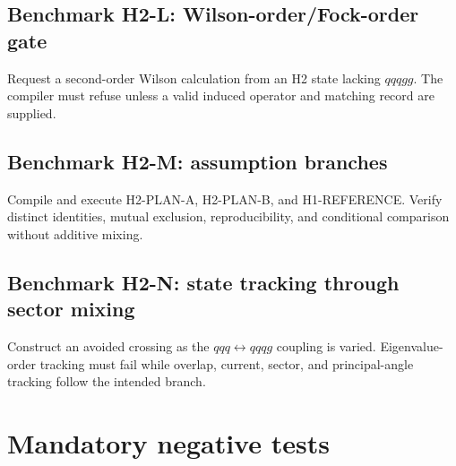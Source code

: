 \documentclass[11pt]{article}
\begin{document}
\subsection{Benchmark H2-L: Wilson-order/Fock-order gate}

Request a second-order Wilson calculation from an H2 state lacking
\(qqqgg\).  The compiler must refuse unless a valid induced operator and
matching record are supplied.

\subsection{Benchmark H2-M: assumption branches}

Compile and execute H2-PLAN-A, H2-PLAN-B, and H1-REFERENCE.  Verify distinct
identities, mutual exclusion, reproducibility, and conditional comparison
without additive mixing.

\subsection{Benchmark H2-N: state tracking through sector mixing}

Construct an avoided crossing as the \(qqq\leftrightarrow qqqg\) coupling is
varied.  Eigenvalue-order tracking must fail while overlap, current, sector,
and principal-angle tracking follow the intended branch.

\section{Mandatory negative tests}
\end{document}
